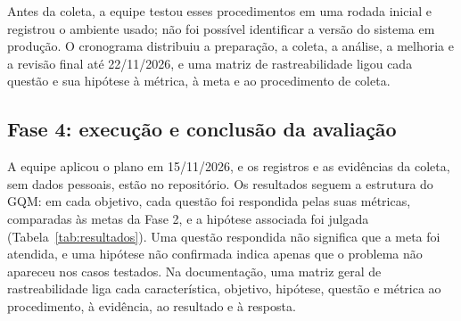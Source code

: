 \documentclass[12pt]{article}
\begin{document}
Antes da coleta, a equipe testou esses procedimentos em uma rodada inicial e
registrou o ambiente usado; não foi possível identificar a versão do sistema em
produção. O cronograma distribuiu a preparação, a coleta, a análise, a melhoria e a
revisão final até 22/11/2026, e uma matriz de rastreabilidade ligou cada questão e
sua hipótese à métrica, à meta e ao procedimento de coleta.

\FloatBarrier
\subsection{Fase 4: execução e conclusão da avaliação}\label{sec:fase4}

A equipe aplicou o plano em 15/11/2026, e os registros e as evidências da coleta,
sem dados pessoais, estão no repositório. Os resultados seguem a estrutura do GQM:
em cada objetivo, cada questão foi respondida pelas suas métricas, comparadas às metas
da Fase 2, e a hipótese associada foi julgada (Tabela~\ref{tab:resultados}). Uma
questão respondida não significa que a meta foi atendida, e uma hipótese não
confirmada indica apenas que o problema não apareceu nos casos testados. Na
documentação, uma matriz geral de rastreabilidade liga cada característica, objetivo,
hipótese, questão e métrica ao procedimento, à evidência, ao resultado e à resposta.
\end{document}
